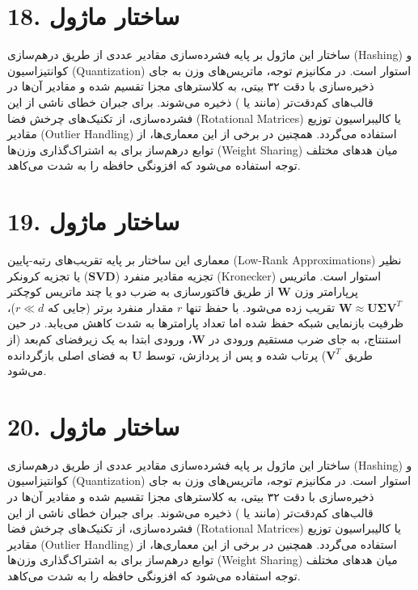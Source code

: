 \documentclass[12pt,a4paper]{report}
\begin{document}
\section*{18. ساختار ماژول }
ساختار این ماژول بر پایه فشرده‌سازی مقادیر عددی از طریق درهم‌سازی (Hashing) و کوانتیزاسیون (Quantization) استوار است. در مکانیزم توجه، ماتریس‌های وزن به جای ذخیره‌سازی با دقت ۳۲ بیتی، به کلاسترهای مجزا تقسیم شده و مقادیر آن‌ها در قالب‌های کم‌دقت‌تر (مانند  یا ) ذخیره می‌شوند. برای جبران خطای ناشی از این فشرده‌سازی، از تکنیک‌های چرخش فضا (Rotational Matrices) یا کالیبراسیون توزیع مقادیر (Outlier Handling) استفاده می‌گردد. همچنین در برخی از این معماری‌ها، از توابع درهم‌ساز برای به اشتراک‌گذاری وزن‌ها (Weight Sharing) میان هد‌های مختلف توجه استفاده می‌شود که افزونگی حافظه را به شدت می‌کاهد.

\section*{19. ساختار ماژول }
معماری این ساختار بر پایه تقریب‌های رتبه-پایین (Low-Rank Approximations) نظیر تجزیه مقادیر منفرد ($\mathbf{SVD}$) یا تجزیه کرونکر (Kronecker) استوار است. ماتریس پرپارامتر وزن $\mathbf{W}$ از طریق فاکتورسازی به ضرب دو یا چند ماتریس کوچکتر $\mathbf{W} \approx \mathbf{U} \mathbf{\Sigma} \mathbf{V}^T$ تقریب زده می‌شود. با حفظ تنها $r$ مقدار منفرد برتر (جایی که $r \ll d$)، ظرفیت بازنمایی شبکه حفظ شده اما تعداد پارامترها به شدت کاهش می‌یابد. در حین استنتاج، به جای ضرب مستقیم ورودی در $\mathbf{W}$، ورودی ابتدا به یک زیرفضای کم‌بعد (از طریق $\mathbf{V}^T$) پرتاب شده و پس از پردازش، توسط $\mathbf{U}$ به فضای اصلی بازگردانده می‌شود.

\section*{20. ساختار ماژول }
ساختار این ماژول بر پایه فشرده‌سازی مقادیر عددی از طریق درهم‌سازی (Hashing) و کوانتیزاسیون (Quantization) استوار است. در مکانیزم توجه، ماتریس‌های وزن به جای ذخیره‌سازی با دقت ۳۲ بیتی، به کلاسترهای مجزا تقسیم شده و مقادیر آن‌ها در قالب‌های کم‌دقت‌تر (مانند  یا ) ذخیره می‌شوند. برای جبران خطای ناشی از این فشرده‌سازی، از تکنیک‌های چرخش فضا (Rotational Matrices) یا کالیبراسیون توزیع مقادیر (Outlier Handling) استفاده می‌گردد. همچنین در برخی از این معماری‌ها، از توابع درهم‌ساز برای به اشتراک‌گذاری وزن‌ها (Weight Sharing) میان هد‌های مختلف توجه استفاده می‌شود که افزونگی حافظه را به شدت می‌کاهد.
\end{document}

